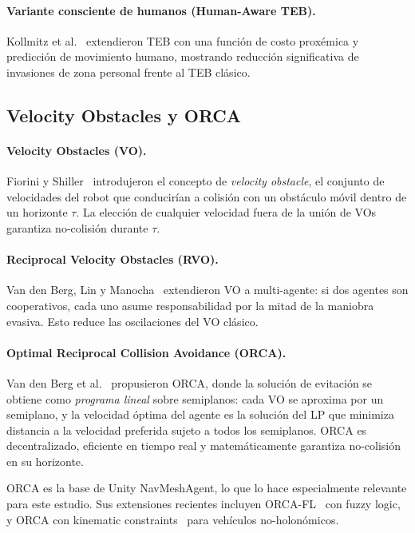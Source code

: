 \documentclass[12pt,a4paper,oneside]{book}
\begin{document}
\paragraph{Variante consciente de humanos (Human-Aware TEB).} Kollmitz et al.~\cite{Kollmitz2021} extendieron TEB con una función de costo proxémica y predicción de movimiento humano, mostrando reducción significativa de invasiones de zona personal frente al TEB clásico.

\subsection{Velocity Obstacles y ORCA}

\paragraph{Velocity Obstacles (VO).} Fiorini y Shiller~\cite{Fiorini1993,Fiorini1998} introdujeron el concepto de \emph{velocity obstacle}, el conjunto de velocidades del robot que conducirían a colisión con un obstáculo móvil dentro de un horizonte $\tau$. La elección de cualquier velocidad fuera de la unión de VOs garantiza no-colisión durante $\tau$.

\paragraph{Reciprocal Velocity Obstacles (RVO).} Van den Berg, Lin y Manocha~\cite{VandenBerg2008} extendieron VO a multi-agente: si dos agentes son cooperativos, cada uno asume responsabilidad por la mitad de la maniobra evasiva. Esto reduce las oscilaciones del VO clásico.

\paragraph{Optimal Reciprocal Collision Avoidance (ORCA).} Van den Berg et al.~\cite{VandenBerg2011} propusieron ORCA, donde la solución de evitación se obtiene como \emph{programa lineal} sobre semiplanos: cada VO se aproxima por un semiplano, y la velocidad óptima del agente es la solución del LP que minimiza distancia a la velocidad preferida sujeto a todos los semiplanos. ORCA es decentralizado, eficiente en tiempo real y matemáticamente garantiza no-colisión en su horizonte.

ORCA es la base de Unity NavMeshAgent, lo que lo hace especialmente relevante para este estudio. Sus extensiones recientes incluyen ORCA-FL~\cite{London2025} con fuzzy logic, y ORCA con kinematic constraints~\cite{Alonso2018,Snape2011} para vehículos no-holonómicos.
\end{document}

